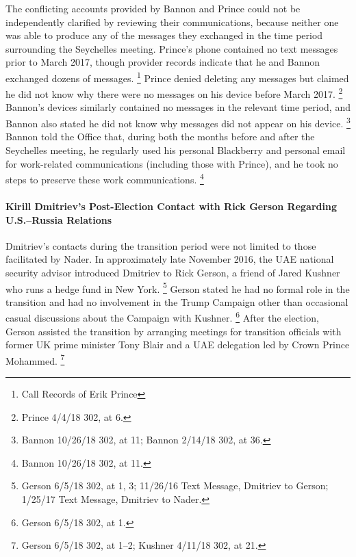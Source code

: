 The conflicting accounts provided by Bannon and Prince could not be independently clarified by reviewing their communications, because neither one was able to produce any of the messages they exchanged in the time period surrounding the Seychelles meeting.
Prince's phone contained no text messages prior to March 2017, though provider records indicate that he and Bannon exchanged dozens of messages.%
\footnote{Call Records of Erik Prince }
Prince denied deleting any messages but claimed he did not know why there were no messages on his device before March 2017.%
\footnote{Prince 4/4/18 302, at 6.}
Bannon's devices similarly contained no messages in the relevant time period, and Bannon also stated he did not know why messages did not appear on his device.%
\footnote{Bannon 10/26/18 302, at 11;
Bannon 2/14/18 302, at 36.}
Bannon told the Office that, during both the months before and after the Seychelles meeting, he regularly used his personal Blackberry and personal email for work-related communications (including those with Prince), and he took no steps to preserve these work communications.%
\footnote{Bannon 10/26/18 302, at 11.}

\paragraph{Kirill Dmitriev's Post-Election Contact with Rick Gerson Regarding U.S.--Russia Relations}

Dmitriev's contacts during the transition period were not limited to those facilitated by Nader.
In approximately late November 2016, the UAE national security advisor introduced Dmitriev to Rick Gerson, a friend of Jared Kushner who runs a hedge fund in New York.%
\footnote{Gerson 6/5/18 302, at 1, 3;
11/26/16 Text Message, Dmitriev to Gerson;
1/25/17 Text Message, Dmitriev to Nader.}
Gerson stated he had no formal role in the transition and had no involvement in the Trump Campaign other than occasional casual discussions about the Campaign with Kushner.%
\footnote{Gerson 6/5/18 302, at 1.}
After the election, Gerson assisted the transition by arranging meetings for transition officials with former UK prime minister Tony Blair and a UAE delegation led by Crown Prince Mohammed.%
\footnote{Gerson 6/5/18 302, at 1--2;
Kushner 4/11/18 302, at 21.}

